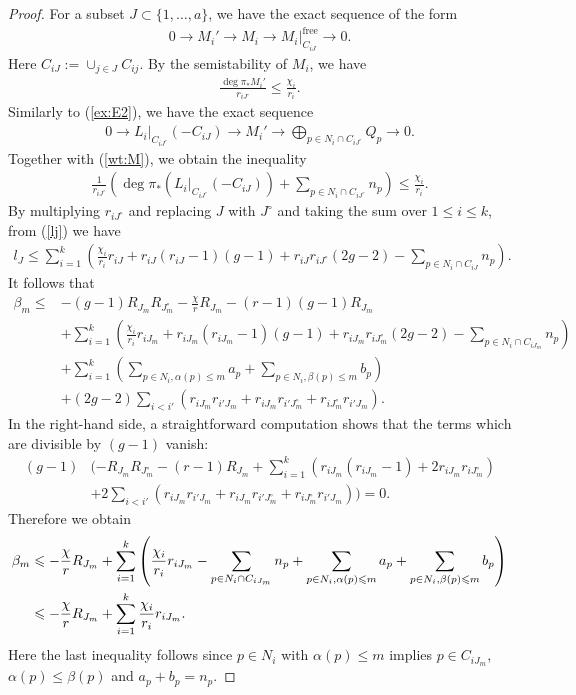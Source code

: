 \documentclass[11pt,oneside,a4paper,mathscr]{amsart}
\theoremstyle{definition}
\renewcommand{\leq}{\leqslant}
\begin{document}
\begin{proof}
For a subset $J\subset \{1, \ldots, a\}$, we have the 
exact sequence of the form 
\begin{align*}
    0\to M_i' \to M_i \to M_i|_{C_{iJ}}^{\mathrm{free}} \to 0.
\end{align*}
Here $C_{iJ}:=\cup_{j\in J} C_{ij}$. 
By the semistability of $M_i$, we have 
\begin{align}\label{wt:M}
    \frac{\deg \pi_{*}M_i'}{r_{iJ^{\circ}}} \leq \frac{\chi_i}{r_i}.
\end{align}
Similarly to (\ref{ex:E2}), we have the 
exact sequence 
\begin{align*}
    0\to L_i|_{C_{iJ^{\circ}}}(-C_{iJ}) \to M_i' \to\bigoplus_{p\in N_i \cap C_{iJ^{\circ}}}Q_p\to 0.
\end{align*}
Together with (\ref{wt:M}), we obtain the inequality
\begin{align*}
    \frac{1}{r_{iJ^{\circ}}}\left(\deg \pi_{*}(L_{i}|_{C_{iJ^{\circ}}}(-C_{iJ}))+\sum_{p\in N_i \cap C_{iJ^{\circ}}}n_p  \right)\leq\frac{\chi_i}{r_i}.
\end{align*}
By multiplying $r_{iJ^{\circ}}$ and replacing $J$ with $J^{\circ}$ and taking the sum over $1\leq i \leq k$, 
from (\ref{lj}) we have 
\begin{align}\label{wt:lJ}
    l_J \leq \sum_{i=1}^k \left(\frac{\chi_i}{r_i}r_{iJ}+r_{iJ}(r_{iJ}-1)(g-1)+r_{iJ}r_{iJ^{\circ}}(2g-2)-\sum_{p\in N_i \cap C_{iJ}}n_p   \right).
\end{align}
It follows that 
\begin{align*}
    \beta_m \leq & -(g-1)R_{J_m}R_{J_m^{\circ}}-\frac{\chi}{r}R_{J_m}-(r-1)(g-1)R_{J_m} \\
    &+\sum_{i=1}^k \left(\frac{\chi_i}{r_i}r_{iJ_m}+r_{iJ_m}(r_{iJ_m}-1)(g-1)+r_{iJ_m}r_{iJ_m^{\circ}}(2g-2)-\sum_{p\in N_i \cap C_{iJ_m}}n_p  \right) \\
    &+\sum_{i=1}^k \left(\sum_{p\in N_i, \alpha(p)\leq m}a_p+\sum_{p\in N_i, \beta(p)\leq m}b_p\right) \\
    &+(2g-2)\sum_{i<i'}(r_{iJ_m}r_{i'J_m}+r_{iJ_m}r_{i' J_m^{\circ}}+r_{i J_m^{\circ}}r_{i' J_m}).
\end{align*}
In the right-hand side, a straightforward computation shows that the terms which are divisible by $(g-1)$
vanish: 
\begin{align*}
    (g-1)&(-R_{J_m}R_{J_m^{\circ}}-(r-1)R_{J_m}+\sum_{i=1}^k(r_{iJ_m}(r_{iJ_m}-1)+2r_{iJ_m}r_{iJ_m^{\circ}}) \\
    &+2\sum_{i<i'}(r_{iJ_m}r_{i'J_m}+r_{iJ_m}r_{i'J_m^{\circ}}+r_{iJ_m^{\circ}}r_{i'J_m}))=0.
\end{align*}
Therefore we obtain 
\begin{align}\label{ineq:beta}
    \beta_m &\leq -\frac{\chi}{r}R_{J_m}+\sum_{i=1}^k \left(\frac{\chi_i}{r_i}r_{iJ_m}-
    \sum_{p\in N_i \cap C_{iJ_m}}n_p
  +\sum_{p\in N_i, \alpha(p)\leq m}a_p+\sum_{p\in N_i, \beta(p)\leq m}b_p  \right) \\
    &\notag \leq -\frac{\chi}{r}R_{J_m}+\sum_{i=1}^k \frac{\chi_i}{r_i}r_{iJ_m}.
\end{align}
Here the last inequality follows since $p\in N_i$ with $\alpha(p) \leq m$ implies 
$p\in C_{iJ_m}$, $\alpha(p)\leq \beta(p)$ and $a_p+b_p=n_p$.


\end{proof}
\end{document}
